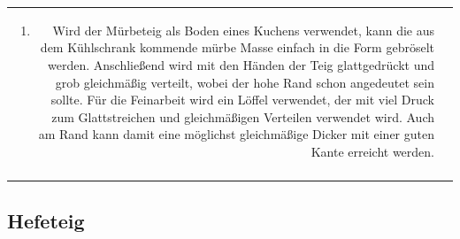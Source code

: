\documentclass[a4paper, 12pt]{scrbook} 								%
\numberwithin{equation}{section} 									%
\begin{document}
\begin{tabularx}{\textwidth}{r|L}
\begin{enumerate}[]
											\item Wird der Mürbeteig als Boden eines Kuchens verwendet, kann die aus dem Kühlschrank kommende mürbe Masse einfach in die Form gebröselt werden. Anschließend wird mit den Händen der Teig glattgedrückt und grob gleichmäßig verteilt, wobei der hohe Rand schon angedeutet sein sollte. Für die Feinarbeit wird ein Löffel verwendet, der mit viel Druck zum Glattstreichen und gleichmäßigen Verteilen verwendet wird. Auch am Rand kann damit eine möglichst gleichmäßige Dicker mit einer guten Kante erreicht werden. 
										\end{enumerate}	\\
									&	\\
		\end{tabularx}
		\newpage



		\subsection{Hefeteig} \label{hefeteig_grundrezept}
		
\end{document}
